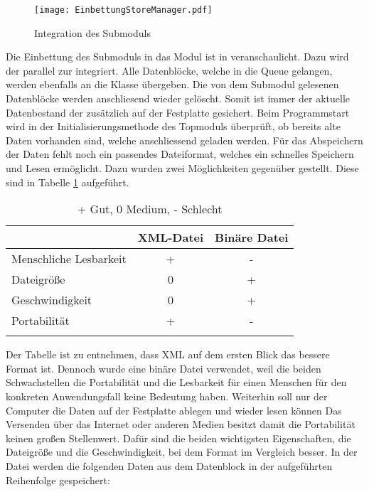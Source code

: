 \begin{figure}[H]
\centering
\texttt{[image: EinbettungStoreManager.pdf]}
\caption{Integration des Submoduls }
\label{fig:EinbettungStoreManager}
\end{figure}

Die Einbettung des Submoduls  in das Modul  ist
in  veranschaulicht. Dazu wird der
 parallel zur  integriert. Alle
Datenblöcke, welche in die Queue gelangen, werden ebenfalls an die
Klasse  übergeben. Die von dem Submodul 
gelesenen Datenblöcke werden anschliesend wieder gelöscht. Somit ist immer der
aktuelle Datenbestand der 
zusätzlich auf der Festplatte gesichert. Beim Programmstart wird in der
Initialisierungsmethode des Topmoduls überprüft, ob bereits alte Daten vorhanden
sind, welche anschliessend geladen werden. \newline
Für das Abspeichern der
Daten fehlt noch ein passendes Dateiformat, welches ein schnelles Speichern und
Lesen ermöglicht. Dazu wurden zwei Möglichkeiten gegenüber gestellt. Diese sind
in Tabelle \ref{tab:Speicherformate} aufgeführt.

\begin{longtable}{|lcc|}
\caption{Vergleich der Speicherformate} \\
\hline
\label{tab:Speicherformate}
\textbf{} & \textbf{XML-Datei} & \textbf{Binäre Datei}\\
\hline
  Menschliche Lesbarkeit      &  + & - \\
  Dateigröße      &  0 & + \\
  Geschwindigkeit &  0 & + \\
  Portabilität    &  + & - \\
\hline
\caption*{ + Gut, 0 Medium, - Schlecht }
\end{longtable}

Der Tabelle ist zu entnehmen, dass XML auf dem ersten Blick das bessere Format
ist. Dennoch wurde eine binäre Datei verwendet, weil die beiden Schwachstellen
die Portabilität und die Lesbarkeit für einen Menschen für den konkreten
Anwendungsfall keine Bedeutung haben.
Weiterhin soll nur der Computer die Daten auf der Festplatte ablegen und
wieder lesen können Das Versenden über das Internet oder anderen
Medien besitzt damit die Portabilität keinen großen Stellenwert.
Dafür sind die beiden wichtigsten Eigenschaften, die Dateigröße und die
Geschwindigkeit, bei dem Format im Vergleich besser.
\newline
In der Datei werden die folgenden Daten aus dem Datenblock in der
aufgeführten Reihenfolge gespeichert:

